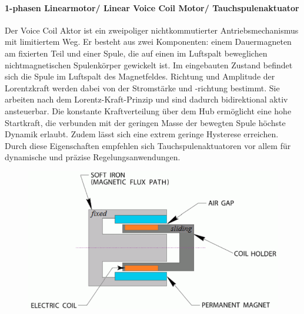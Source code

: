 				\paragraph{1-phasen Linearmotor/ Linear Voice Coil Motor/ Tauchspulenaktuator}
					Der Voice Coil Aktor ist ein zweipoliger nichtkommutierter Antriebsmechanismus mit limitiertem Weg. Er besteht aus zwei Komponenten: einem Dauermagneten am fixierten Teil und einer Spule, die auf einen im Luftspalt beweglichen nichtmagnetischen Spulenkörper gewickelt ist. Im eingebauten Zustand befindet sich die Spule im Luftspalt des Magnetfeldes. Richtung und Amplitude der Lorentzkraft werden dabei von der Stromstärke und -richtung bestimmt. Sie arbeiten nach dem Lorentz-Kraft-Prinzip und sind dadurch bidirektional aktiv ansteuerbar. Die konstante Kraftverteilung über dem Hub ermöglicht eine hohe Startkraft, die verbunden mit der geringen Masse der bewegten Spule höchste Dynamik erlaubt. Zudem lässt sich eine extrem geringe Hysterese erreichen. Durch diese Eigenschaften empfehlen sich Tauchspulenaktuatoren vor allem für dynamische und präzise Regelungsanwendungen.
					\begin{figure}[h]
						\centering
						\includegraphics[width=0.6\linewidth]{./pics/el/vcm}
					\end{figure}
					\leavevmode \\
					
